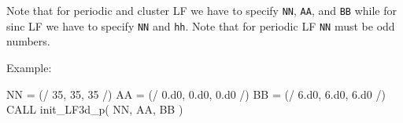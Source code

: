 Note that for periodic and cluster LF we have to specify {\tt NN}, {\tt AA}, and {\tt BB}
while for sinc LF we have to specify {\tt NN} and {\tt hh}.
Note that for periodic LF {\tt NN} must be odd numbers.

Example:
\begin{fortrancode}
NN = (/ 35, 35, 35 /)
AA = (/ 0.d0, 0.d0, 0.d0 /)
BB = (/ 6.d0, 6.d0, 6.d0 /)
CALL init_LF3d_p( NN, AA, BB )
\end{fortrancode}
